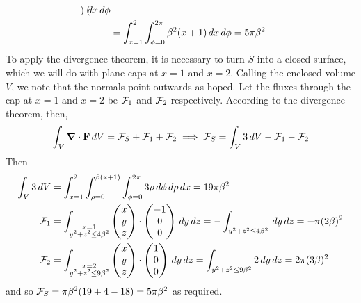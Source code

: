 \documentclass{../../template/note}
\begin{document}
\begin{example*}[hard]
\begin{align*}
\begin{pmatrix}
            \end{pmatrix} \,d{x} \,d{\phi} \\
            &= \int_{x=1}^2 \int_{\phi=0}^{2\pi} \beta^2(x+1) \,d{x} \,d{\phi} = 5\pi \beta^2
        \end{align*}
        To apply the divergence theorem, it is necessary to turn \(S\) into a closed surface, which we will do with plane caps at \(x=1\) and \(x=2\). Calling the enclosed volume \(V\), we note that the normals point outwards as hoped. Let the fluxes through the cap at \(x=1\) and \(x=2\) be \(\mathcal{F}_1\) and \(\mathcal{F}_2\) respectively. According to the divergence theorem, then,
        \begin{align*}
            \int_V \div \V F \D V = \mc F_S + \mc F_1 + \mc F_2 \implies \mc F_S = \int_V 3 \D V - \mc F_1 - \mc F_2
        \end{align*}
        Then
        \begin{align*}
            \int_V 3 \,d{V} &= \int_{x=1}^2 \int_{\rho=0}^{\beta(x+1)} \int_{\phi=0}^{2\pi} 3 \rho \,d{\phi} \,d{\rho} \,d{x} = 19\pi \beta^2 \\
            \mathcal{F}_1 &= \int_{\substack{x=1 \\ y^2 + z^2 \leq 4\beta^2}} \begin{pmatrix}
             x \\
             y \\
             z \\
            \end{pmatrix} \cdot \begin{pmatrix}
             -1 \\
             0 \\
             0 \\
            \end{pmatrix} \,d{y}\,d{z} = -\int_{y^2+z^2 \leq 4\beta^2} \,d{y}\,d{z} = -\pi(2\beta)^2 \\
            \mathcal{F}_2 &= \int_{\substack{x=2 \\ y^2 + z^2 \leq 9\beta^2}} \begin{pmatrix}
             x \\
             y \\
             z \\
            \end{pmatrix} \cdot \begin{pmatrix}
             1 \\
             0 \\
             0 \\
            \end{pmatrix} \,d{y}\,d{z} = \int_{y^2+z^2 \leq 9\beta^2} 2 \,d{y}\,d{z} = 2\pi(3\beta)^2
        \end{align*}
        and so \(\mathcal{F}_S = \pi\beta^2(19+4-18) = 5\pi\beta^2\) as required.
    \end{example*}
    
\end{document}
